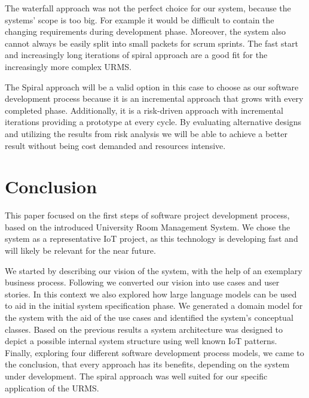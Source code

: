 \documentclass[article,onecolumn]{IEEEtran}
\begin{document}

The waterfall approach was not the perfect choice for our system, because the systems' scope is too big. For example it would be difficult to contain the changing requirements during development phase.
Moreover, the system also cannot always be easily split into small packets for scrum sprints.
The fast start and increasingly long iterations of spiral approach are a good fit for the increasingly more complex URMS.

The Spiral approach will be a valid option in this case to choose as our software development process because it is an incremental approach that grows with every completed phase. Additionally, it is a risk-driven approach with incremental iterations providing a prototype at every cycle. By evaluating alternative designs and utilizing the results from risk analysis we will be able to achieve a better result without being cost demanded and resources intensive.

\section{Conclusion}

This paper focused on the first steps of software project development process, based on the introduced University Room Management System.
We chose the system as a representative IoT project, as this technology is developing fast and will likely be relevant for the near future.

We started by describing our vision of the system, with the help of an exemplary business process.
Following we converted our vision into use cases and user stories.
In this context we also explored how large language models can be used to aid in the initial system specification phase.
We generated a domain model for the system with the aid of the use cases and identified the system's conceptual classes.
Based on the previous results a system architecture was designed to depict a possible internal system structure using well known IoT patterns.
Finally, exploring four different software development process models, we came to the conclusion, that every approach has its benefits, depending on the system under development. The spiral approach was well suited for our specific application of the URMS.
\end{document}
